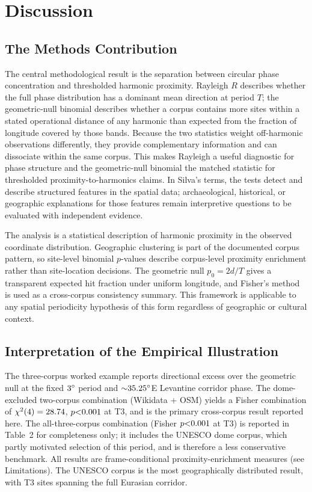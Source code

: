 \documentclass[12pt,a4paper]{article}
\newcommand{\degr}{\ifmmode^\circ\else\textdegree{}\fi}
\begin{document}
\FloatBarrier
\section{Discussion}
\label{sec:discussion}

\subsection{The Methods Contribution}

The central methodological result is the separation between circular
phase concentration and thresholded harmonic proximity. Rayleigh $R$
describes whether the full phase distribution has a dominant mean
direction at period $T$; the geometric-null binomial describes whether
a corpus contains more sites within a stated operational distance of any
harmonic than expected from the fraction of longitude covered by those
bands. Because the two statistics weight off-harmonic observations
differently, they provide complementary information and can dissociate
within the same corpus. This makes Rayleigh a useful diagnostic for
phase structure and the geometric-null binomial the matched statistic
for thresholded proximity-to-harmonics claims. In Silva's terms, the
tests detect and describe structured features in the spatial data;
archaeological, historical, or geographic explanations for those
features remain interpretive questions to be evaluated with independent
evidence.

The analysis is a statistical description of harmonic proximity in the
observed coordinate distribution.
Geographic clustering is part of the documented corpus pattern, so
site-level binomial $p$-values describe corpus-level proximity
enrichment rather than site-location decisions. The geometric
null $p_0 = 2d/T$ gives a transparent expected hit fraction under
uniform longitude, and Fisher's method is used as a
cross-corpus consistency summary. This framework is applicable to any
spatial periodicity hypothesis of this form regardless of geographic
or cultural context.

\subsection{Interpretation of the Empirical Illustration}

The three-corpus worked example reports directional excess
over the geometric null at the fixed $3\degr$ period and ${\sim}35.25\degr$E
Levantine corridor phase. The dome-excluded two-corpus combination (Wikidata + OSM) yields a Fisher
combination of $\chi^2(4) = 28.74{}$, $p {<}0.001{}$ at T3,
and is the primary cross-corpus result reported here.
The all-three-corpus combination (Fisher $p {<}0.001{}$ at T3) is
reported in Table~2 for completeness only; it includes the UNESCO dome corpus,
which partly motivated selection of this period, and is therefore a less
conservative benchmark.
All results are frame-conditional proximity-enrichment measures (see Limitations). The UNESCO corpus is
the most geographically distributed result, with T3 sites spanning the full
Eurasian corridor.
\end{document}
